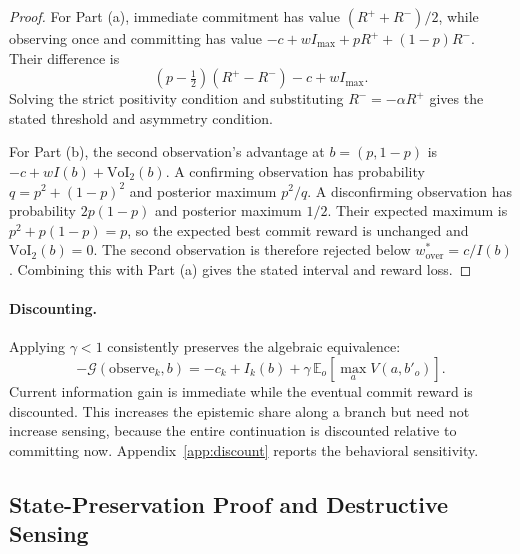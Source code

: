 \documentclass[runningheads]{llncs}
\begin{document}
\begin{proof}
For Part (a), immediate commitment has value $(R^++R^-)/2$, while observing once and committing has value $-c+wI_{\max}+pR^++(1-p)R^-$. Their difference is
\[
(p-\tfrac12)(R^+-R^-)-c+wI_{\max}.
\]
Solving the strict positivity condition and substituting $R^-=-\alpha R^+$ gives the stated threshold and asymmetry condition.

For Part (b), the second observation's advantage at $b=(p,1-p)$ is $-c+wI(b)+\mathrm{VoI}_2(b)$. A confirming observation has probability $q=p^2+(1-p)^2$ and posterior maximum $p^2/q$. A disconfirming observation has probability $2p(1-p)$ and posterior maximum $1/2$. Their expected maximum is $p^2+p(1-p)=p$, so the expected best commit reward is unchanged and $\mathrm{VoI}_2(b)=0$. The second observation is therefore rejected below $w^*_{\mathrm{over}}=c/I(b)$. Combining this with Part (a) gives the stated interval and reward loss.
\end{proof}

\paragraph{Discounting.} Applying $\gamma<1$ consistently preserves the algebraic equivalence:
\[
-\mathcal G(\mathrm{observe}_k,b)=-c_k+I_k(b)+\gamma\,\mathbb E_o[\max_a V(a,b'_o)].
\]
Current information gain is immediate while the eventual commit reward is discounted. This increases the epistemic share along a branch but need not increase sensing, because the entire continuation is discounted relative to committing now. Appendix~\ref{app:discount} reports the behavioral sensitivity.

\subsection{State-Preservation Proof and Destructive Sensing}
\label{app:theory_factored}
\end{document}
